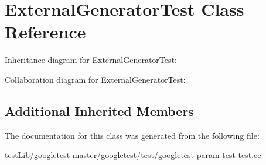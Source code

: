 \hypertarget{classExternalGeneratorTest}{}\section{External\+Generator\+Test Class Reference}
\label{classExternalGeneratorTest}


Inheritance diagram for External\+Generator\+Test\+:


Collaboration diagram for External\+Generator\+Test\+:
\subsection*{Additional Inherited Members}


The documentation for this class was generated from the following file\+:\begin{DoxyCompactItemize}
\item 
test\+Lib/googletest-\/master/googletest/test/googletest-\/param-\/test-\/test.\+cc\end{DoxyCompactItemize}
